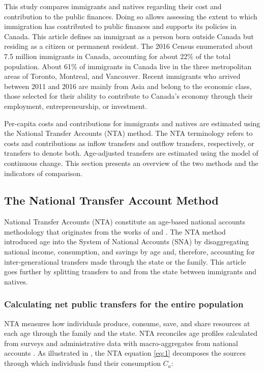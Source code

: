 This study compares immigrants and natives regarding their cost and contribution to the public finances.
Doing so allows assessing the extent to which immigration has contributed to public finances and supports its policies in Canada.
This article defines an immigrant as a person born outside Canada but residing as a citizen or permanent resident.
The 2016 Census enumerated about 7.5 million immigrants in Canada, accounting for about 22\% of the total population.
About 61\% of immigrants in Canada live in the three metropolitan areas of Toronto, Montreal, and Vancouver.
Recent immigrants who arrived between 2011 and 2016 are mainly from Asia and belong to the economic class, those selected for their ability to contribute to Canada's economy through their employment, entrepreneurship, or investment.

\vspace{0.7em}\par
Per-capita costs and contributions for immigrants and natives are estimated using the National Transfer Accounts (NTA) method.
The NTA terminology refers to costs and contributions as inflow transfers and outflow transfers, respectively, or transfers to denote both.
Age-adjusted transfers are estimated using the model of continuous change.
This section presents an overview of the two methods and the indicators of comparison.

\subsection{The National Transfer Account Method}\label{sec:nta}
National Transfer Accounts (NTA) constitute an age-based national accounts methodology that originates from the works of \citet{leeAgeStructureIntergenerational1980} and \citet{Mason:1988fz}.
The NTA method introduced age into the System of National Accounts (SNA) by disaggregating national income, consumption, and savings by age and, therefore, accounting for inter-generational transfers made through the state or the family.
This article goes further by splitting transfers to and from the state between immigrants and natives.

\subsubsection*{Calculating net public transfers for the entire population}
NTA measures how individuals produce, consume, save, and share resources at each age through the family and the state.
NTA reconciles age profiles calculated from surveys and administrative data with macro-aggregates from national accounts \citep{UnitedNations:2013vz}.
As illustrated in \citet{dAlbis:2019de}, the NTA equation \eqref{eq:1} decomposes the sources through which individuals fund their consumption \(C_a\):

